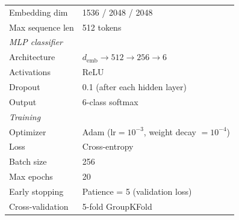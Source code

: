 \begin{table}[t]
\begin{minipage}[t]{0.52\textwidth}
{\begin{tabular}{ll}
    Embedding dim     & 1536 / 2048 / 2048 \\
    Max sequence len   & 512 tokens \\
    \midrule
    \multicolumn{2}{l}{\textit{MLP classifier}} \\
    Architecture      & $d_{\text{emb}} \to 512 \to 256 \to 6$ \\
    Activations       & ReLU \\
    Dropout           & 0.1 (after each hidden layer) \\
    Output            & 6-class softmax \\
    \midrule
    \multicolumn{2}{l}{\textit{Training}} \\
    Optimizer         & Adam ($\text{lr} = 10^{-3}$, weight decay $= 10^{-4}$) \\
    Loss              & Cross-entropy \\
    Batch size        & 256 \\
    Max epochs        & 20 \\
    Early stopping    & Patience = 5 (validation loss) \\
    Cross-validation  & 5-fold GroupKFold \\
    \bottomrule
  \end{tabular}%
  }
\end{minipage}
\end{table}

